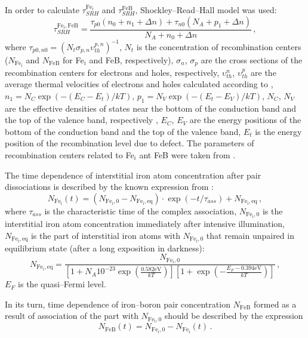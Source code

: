 In order to calculate $\tau_{SRH}^{\mathrm{Fe_i}}$  and $\tau_{SRH}^\mathrm{FeB}$,
Shockley--Read--Hall model was used:
\begin{equation}
\label{eqTauSRH}
\tau_{SRH}^{\mathrm{Fe_i,FeB}}=\frac{\tau_{p0}(n_0+n_1+\Delta n)+\tau_{n0}(N_A+p_1+\Delta n)}
                             {N_A+n_0+\Delta n}\,,
\end{equation}
where
$\tau_{p0,n0}=(N_t \sigma_{p,n}\upsilon_{th}^{p,n})^{-1}$,
$N_t$ is the concentration of recombination centers
($N_\mathrm{Fe_i}$ and $N_\mathrm{FeB}$ for Fe$_i$ and FeB, respectively),
$\sigma_n$, $\sigma_p$  are the cross sections of the recombination centers for electrons and holes, respectively,
$\upsilon_{th}^{n}$, $\upsilon_{th}^{p}$ are the average thermal velocities of electrons and holes calculated according to \cite{Nc:Green},
$n_1=N_C \exp(-(E_C-E_t)/kT)$,
$p_1=N_V \exp(-(E_t-E_V)/kT)$,
$N_C$, $N_V$ are the effective densities of states near the bottom of the conduction band
and the top of the valence band, respectively \cite{Si_ni_Couderc},
$E_C$, $E_V$ are the energy positions of the bottom of the conduction band and
the top of the valence band,
$E_t$ is the energy position of the recombination level due to defect.
The parameters of recombination centers related to Fe$_i$ ant FeB were taken from \cite{ROUGIEUX2018}.

The time dependence of interstitial iron atom concentration
after pair dissociations is described by the known expression from \cite{MurphyJAP2011}:
\begin{equation}
\label{eqNFet}
N_\mathrm{Fe_i}(t)=(N_\mathrm{Fe_i,0}-N_\mathrm{Fe_i,eq})\cdot
\exp(-t/\tau_{ass})+N_\mathrm{Fe_i,eq}\,,
\end{equation}
where
$\tau_{ass}$ is the characteristic time of the complex association,
$N_\mathrm{Fe_i,0}$ is the interstitial iron atom concentration
immediately after intensive illumination,
$N_\mathrm{Fe_i,eq}$ is the part of interstitial iron atoms with $N_\mathrm{Fe_i,0}$
that remain unpaired in equilibrium state (after a long exposition in darkness)\cite{FeB:kinetic}:
\begin{equation}
\label{eqNFeeq}
N_\mathrm{Fe_i,eq}=\frac{N_\mathrm{Fe_i,0}}
   {\left[1+N_A 10^{-23}\exp\left(\frac{0.582\mathrm{eV}}{kT}\right)\right]
    \left[1+\exp\left(-\frac{E_F-0.394\mathrm{eV}}{kT}\right)\right]}\,,
\end{equation}
$E_F$ is the quasi--Fermi level.

In its turn, time dependence of iron--boron pair concentration
$N_\mathrm{FeB}$ formed as a result of association of the part with $N_\mathrm{Fe_i,0}$
should be described by the expression
\begin{equation}
\label{eqNFeBt}
N_\mathrm{FeB}(t)=N_\mathrm{Fe_i,0}-N_\mathrm{Fe_i}(t)\,.
\end{equation}


